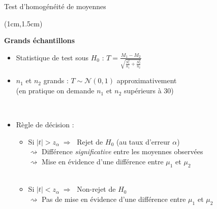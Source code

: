 \documentclass{beamer}
\begin{document}

\begin{frame}{Test d'homogénéité de moyennes}
\begin{textblock*}{\textwidth}(1cm,1.5cm)

\begin{center}{\bf \Large Grands échantillons} \end{center}
\vspace{0.2cm}
\begin{itemize}
\item Statistique de test sous $H_0$ : $
\displaystyle T=\frac{M_1-M_2}{\sqrt{\frac{S_1^2}{n_1}+\frac{S_2^2}{n_2}} }
$
\item $n_1$ et $n_2$  grands : $T\sim \mathcal{N}(0,1)$ approximativement \\ (en pratique on demande $n_1$ et $n_2$ supérieurs à 30)

\
\item Règle de décision : 
\begin{itemize}
\item Si $|t| > z_{\alpha} \; \Rightarrow \; $ Rejet de $H_0$ (au taux d'erreur $\alpha$) \\
$\rightsquigarrow$ Différence \emph{significative} entre les moyennes observées \\
$\rightsquigarrow$ Mise en évidence d'une différence entre $\mu_1$ et $\mu_2$ \\

\
\item Si $|t| < z_{\alpha} \; \Rightarrow \; $ Non-rejet de $H_0$ \\

$\rightsquigarrow$ Pas de mise en évidence d'une différence entre $\mu_1$ et $\mu_2$

\end{itemize}
\end{itemize}

\end{textblock*}
\end{frame}

\end{document}

